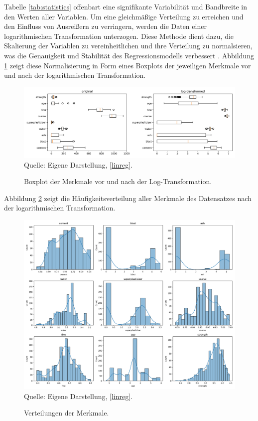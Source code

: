 Tabelle \ref{tab:statistics} offenbart eine signifikante Variabilität und Bandbreite 
in den Werten aller Variablen. Um eine gleichmäßige Verteilung zu erreichen und den 
Einfluss von Ausreißern zu verringern, werden die Daten einer logarithmischen Transformation unterzogen. 
Diese Methode dient dazu, die Skalierung der Variablen zu vereinheitlichen und ihre Verteilung zu normalsieren, 
was die Genauigkeit und Stabilität des Regressionsmodells verbessert \cite[S. 105f]{Feng2014LogTransformation}.
Abbildung \ref{pic:box} zeigt diese Normalisierung in Form eines Boxplots der jeweiligen Merkmale vor und 
nach der logarithmischen Transformation.

\begin{figure}[!h]
    \caption{Boxplot der Merkmale vor und nach der Log-Transformation.}
    \includegraphics[width=1\textwidth]{../scripts/images/boxplot.png}
    Quelle: Eigene Darstellung, \ref{linreg}.
    \label{pic:box}
\end{figure}

Abbildung \ref{pic:hist} zeigt die Häufigkeitsverteilung aller Merkmale des Datensatzes 
nach der logarithmischen Transformation. 

\begin{figure}[!h]
    \caption{Verteilungen der Merkmale.}
    \includegraphics[width=1\textwidth]{../scripts/images/dist.png}
    Quelle: Eigene Darstellung, \ref{linreg}.
    \label{pic:hist}
\end{figure}

